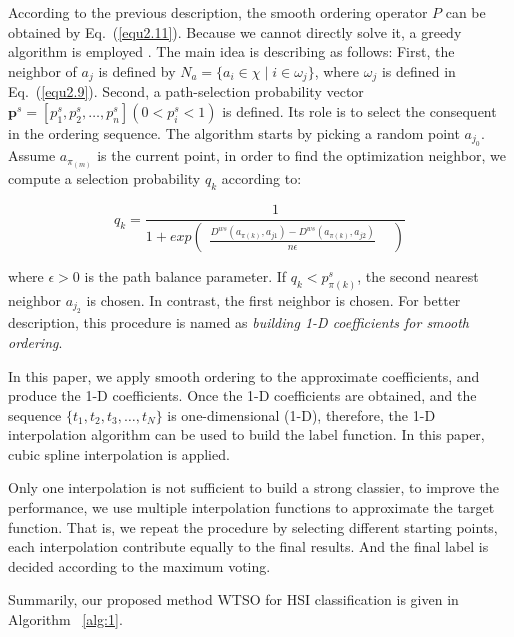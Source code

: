 \documentclass{ws-ijwmip}
\begin{document}
According to the previous description, the smooth ordering operator $P$ can be obtained by Eq.~(\ref{equ2.11}). 
Because we cannot directly solve it, a greedy algorithm is employed \cite{39}. The main idea is describing as follows: First, the neighbor of $a_j$ is defined by $N_a = \{a_i \in \chi \mid i \in \omega _j\}$, where $\omega_j$ is defined in Eq.~(\ref{equ2.9}). Second, a path-selection probability vector $\pmb p^s = [p_1^s,p_2^s,\dots,p_n^s] (0<p_i^s<1)$ is defined.
Its role is to select the consequent in the ordering sequence. 
The algorithm starts by picking a random point $a_{j_0}$. Assume $a_{\pi_(m)}$ is the current point, in order to find the optimization neighbor, we compute a selection probability $q_k$ according to:

\begin{equation}
q_k = \frac{1}{1+exp\begin{pmatrix}
\frac{D^{ws}(a_{\pi(k)},a_{j1})-D^{ws}(a_{\pi(k)},a_{j2})}{n\epsilon } &
\end{pmatrix}}
\label{equ2.17}
\end{equation}



 \noindent where $\epsilon>0$ is the path balance parameter. If $q_k<p^s_{\pi(k)}$, the second nearest neighbor $a_{j_2}$ is chosen. In contrast, the first neighbor is chosen. 
For better description, this procedure is named as \emph{building 1-D coefficients for smooth ordering}.


In this paper, we apply smooth ordering to the approximate coefficients, and produce the 1-D coefficients. Once the 1-D coefficients are obtained, and the sequence $\{t_1,t_2,t_3,\dots, t_N\}$ is one-dimensional (1-D), therefore, the 1-D interpolation algorithm can be used to build the label function. In this paper, cubic spline interpolation is applied. 

Only one interpolation is not sufficient to build a strong classier, to improve the performance, we use multiple interpolation functions to approximate the target function. That is, we repeat the procedure by selecting different starting points, each interpolation contribute equally to the final results. And the final label is decided according to the maximum voting.

Summarily, our proposed method WTSO for HSI classification is given in Algorithm ~\ref{alg:1}.
\end{document}
